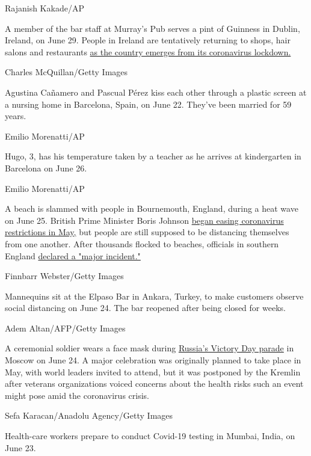 Rajanish Kakade/AP

A member of the bar staff at Murray's Pub serves a pint of Guinness in
Dublin, Ireland, on June 29. People in Ireland are tentatively returning
to shops, hair salons and restaurants
\href{https://www.cnn.com/travel/article/ireland-reopens-blarney-stone-scli-intl/index.html}{as
the country emerges from its coronavirus lockdown.}

Charles McQuillan/Getty Images

Agustina Cañamero and Pascual Pérez kiss each other through a plastic
screen at a nursing home in Barcelona, Spain, on June 22. They've been
married for 59 years.

Emilio Morenatti/AP

Hugo, 3, has his temperature taken by a teacher as he arrives at
kindergarten in Barcelona on June 26.

Emilio Morenatti/AP

A beach is slammed with people in Bournemouth, England, during a heat
wave on June 25. British Prime Minister Boris Johnson
\href{https://www.cnn.com/2020/05/10/uk/uk-coronavirus-lockdown-boris-johnson-gbr-intl/index.html}{began
easing coronavirus restrictions in May,} but people are still supposed
to be distancing themselves from one another. After thousands flocked to
beaches, officials in southern England
\href{https://edition.cnn.com/travel/article/bournemouth-major-incident-beaches-scli-intl-gbr/index.html}{declared
a "major incident."}

Finnbarr Webster/Getty Images

Mannequins sit at the Elpaso Bar in Ankara, Turkey, to make customers
observe social distancing on June 24. The bar reopened after being
closed for weeks.

Adem Altan/AFP/Getty Images

A ceremonial soldier wears a face mask during
\href{https://edition.cnn.com/2020/06/24/europe/victory-day-moscow-parade-coronavirus-2020-intl/index.html}{Russia's
Victory Day parade} in Moscow on June 24. A major celebration was
originally planned to take place in May, with world leaders invited to
attend, but it was postponed by the Kremlin after veterans organizations
voiced concerns about the health risks such an event might pose amid the
coronavirus crisis.

Sefa Karacan/Anadolu Agency/Getty Images

Health-care workers prepare to conduct Covid-19 testing in Mumbai,
India, on June 23.

